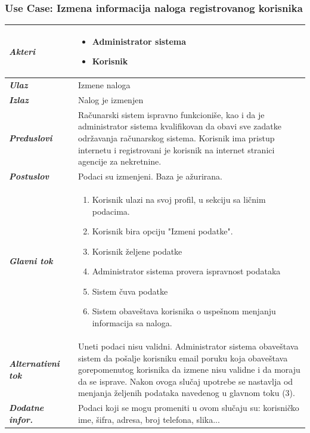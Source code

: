 \documentclass[20pt]{article}
\begin{document}
\subsubsection{\bfseries \large Use Case: Izmena informacija naloga registrovanog korisnika}
\begin{center}
\begin{longtable}{p{0.23\linewidth} p{0.77\linewidth}}
 \hline
 {\it \bfseries Akteri} & \begin{itemize}
    \item Administrator sistema
    \item Korisnik
\end{itemize}\\
\hline

 {\it \bfseries Ulaz} & Izmene naloga\\
 \hline
 
 {\it \bfseries Izlaz} & Nalog je izmenjen\\
 \hline
 
 {\it \bfseries Preduslovi} & Ra\v {c}unarski sistem ispravno funkcioni\v {s}e, kao i da je administrator sistema kvalifikovan da obavi sve zadatke odr\v {z}avanja ra\v {c}unarskog sistema. Korisnik ima pristup internetu i registrovani je korisnik na internet stranici agencije za nekretnine.\\
 \hline
 
 {\it \bfseries Postuslov} & Podaci su izmenjeni. Baza je a\v {z}urirana.\\
 \hline

     {\it \bfseries Glavni tok} &  
     \begin{enumerate}
         \item Korisnik ulazi na svoj profil, u sekciju sa li\v {c}nim podacima.
         \item Korisnik bira opciju "Izmeni podatke".
         \item Korisnik \v {z}eljene podatke
         \item Administrator sistema provera ispravnost podataka
         \item Sistem \v {c}uva podatke
         \item Sistem obave\v {s}tava korisnika o uspe\v {s}nom menjanju informacija sa naloga.
    \end{enumerate}\\
 \hline
 {\it \bfseries Alternativni tok} & Uneti podaci nisu validni. Administrator sistema obave\v {s}tava sistem da po\v {s}alje korisniku email poruku koja obave\v {s}tava gorepomenutog korisnika da izmene nisu validne i da moraju da se isprave. Nakon ovoga slu\v {c}aj upotrebe se nastavlja od menjanja \v {z}eljenih podataka navedenog u glavnom toku (3).\\
 \hline
 {\it \bfseries Dodatne infor.} & Podaci koji se mogu promeniti u ovom slu\v {c}aju su: korisni\v {c}ko ime, \v {s}ifra, adresa, broj telefona, slika...\\
 \hline

\end{longtable}
\end{center}
\end{document}
